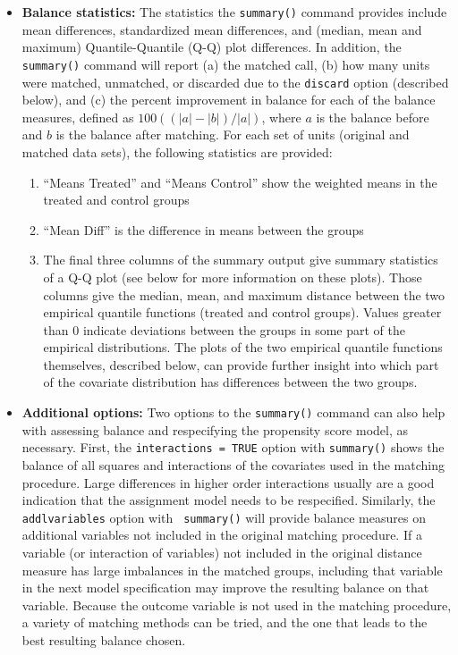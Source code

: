 \begin{itemize}
\item {\bf Balance statistics:} The statistics the \texttt{summary()}
  command provides include mean differences, standardized mean
  differences, and (median, mean and maximum) Quantile-Quantile (Q-Q)
  plot differences.  In addition, the \texttt{summary()} command will
  report (a) the matched call, (b) how many units were matched,
  unmatched, or discarded due to the \texttt{discard} option
  (described below), and (c) the percent improvement in balance for
  each of the balance measures, defined as $100((|a|-|b|)/|a|)$, where
  $a$ is the balance before and $b$ is the balance after matching.
  For each set of units (original and matched data sets), the
  following statistics are provided:
\begin{enumerate}
  \item ``Means Treated'' and ``Means Control'' show the weighted
    means in the treated and control groups
  \item ``Mean Diff'' is the difference in means between the groups
  \item The final three columns of the summary output give summary
    statistics of a Q-Q plot (see below for more information on these
    plots). Those columns give the median, mean, and maximum distance
    between the two empirical quantile functions (treated and control
    groups).  Values greater than 0 indicate deviations between the
    groups in some part of the empirical distributions.  The plots of
    the two empirical quantile functions themselves, described below,
    can provide further insight into which part of the covariate
    distribution has differences between the two groups.
\end{enumerate}

\item {\bf Additional options:} Two options to the \texttt{summary()}
  command can also help with assessing balance and respecifying the
  propensity score model, as necessary.  First, the {\tt interactions
    = TRUE} option with {\tt summary()} shows the balance of all
  squares and interactions of the covariates used in the matching
  procedure.  Large differences in higher order interactions usually
  are a good indication that the assignment model needs to be
  respecified.  Similarly, the {\tt addlvariables} option with {\tt
    summary()} will provide balance measures on additional variables
  not included in the original matching procedure.  If a variable (or
  interaction of variables) not included in the original distance
  measure has large imbalances in the matched groups, including that
  variable in the next model specification may improve the resulting
  balance on that variable.  Because the outcome variable is not used
  in the matching procedure, a variety of matching methods can be
  tried, and the one that leads to the best resulting balance chosen.
\end{itemize}

